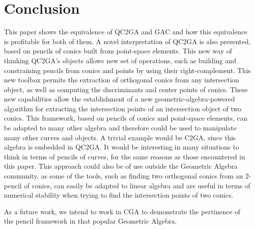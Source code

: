 \documentclass{birkjour}
\begin{document}
\section{Conclusion}
\label{sec:conclusion}
This paper shows the equivalence of QC2GA and GAC and how this equivalence is profitable for both of them. A novel interpretation of QC2GA is also presented, based on pencils of conics built from point-space elements. 
This new way of thinking QC2GA's objects allows new set of operations, such as building and constraining pencils from conics and points by using their right-complement. This new toolbox permits the extraction of orthogonal conics from any intersection object, as well as computing the discriminants and center points of conics. These new capabilities allow the establishment of a new geometric-algebra-powered algorithm for extracting the intersection points of an intersection object of two conics.
This framework, based on pencils of conics and point-space elements, can be adapted to many other algebra and therefore could be used to manipulate many other curves and objects. A trivial example would be C2GA, since this algebra is embedded in QC2GA. It would be interesting in many situations to think in terms of pencils of curves, for the same reasons as those encountered in this paper.
This approach could also be of use outside the Geometric Algebra community, as some of the tools, such as finding two orthogonal conics from an \(2\)-pencil of conics, can easily be adapted to linear algebra and are useful in terms of numerical stability when trying to find the intersection points of two conics.

As a future work, we intend to work in CGA to demonstrate the pertinence of the pencil framework in that popular Geometric Algebra.




\end{document}
